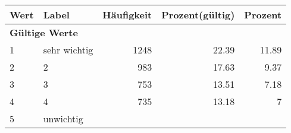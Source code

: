      \begin{longtable}{lXrrr}
     \toprule
     \textbf{Wert} & \textbf{Label} & \textbf{Häufigkeit} & \textbf{Prozent(gültig)} & \textbf{Prozent} \\
     \endhead
     \midrule
     \multicolumn{5}{l}{\textbf{Gültige Werte}}\\

     1 &
     \multicolumn{1}{X}{ sehr wichtig   } &


       \num{1248} &
       \num[round-mode=places,round-precision=2]{22.39} &
         \num[round-mode=places,round-precision=2]{11.89} \\

     2 &
     \multicolumn{1}{X}{ 2   } &


       \num{983} &
       \num[round-mode=places,round-precision=2]{17.63} &
         \num[round-mode=places,round-precision=2]{9.37} \\

     3 &
     \multicolumn{1}{X}{ 3   } &


       \num{753} &
       \num[round-mode=places,round-precision=2]{13.51} &
         \num[round-mode=places,round-precision=2]{7.18} \\

     4 &
     \multicolumn{1}{X}{ 4   } &


       \num{735} &
       \num[round-mode=places,round-precision=2]{13.18} &
         \num[round-mode=places,round-precision=2]{7} \\

     5 &
     \multicolumn{1}{X}{ unwichtig   } &



\end{longtable}

